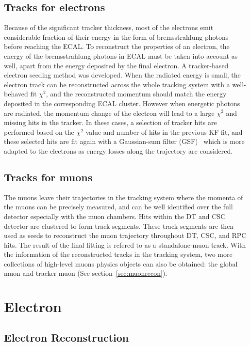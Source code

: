 \subsection{Tracks for electrons}
Because of the significant tracker thickness, most of the electrons emit considerable fraction of their energy in the form of bremsstrahlung photons before reaching the ECAL. To reconstruct the properties of an electron, the energy of the bremsstrahlung photons in ECAL must be taken into account as well, apart from the energy deposited by the final electron. A tracker-based electron seeding method was developed. When the radiated energy is small, the electron track can be reconstructed across the whole tracking system with a well-behaved fit $\chi^2$, and the reconstructed momentum should match the energy deposited in the corresponding ECAL cluster. However when energetic photons are radiated, the momentum change of the electron will lead to a large $\chi^2$ and missing hits in the tracker. In these cases, a selection of tracker hits are performed based on the $\chi^2$ value and number of hits in the previous KF fit, and these selected hits are fit again with a Gaussian-sum filter (GSF)~\cite{ob_electronconst} which is more adapted to the electrons as energy losses along the trajectory are considered. 

\subsection{Tracks for muons}
The muons leave their trajectories in the tracking system where the momenta of the muons can be precisely measured, and can be well identified over the full detector especially with the muon chambers. Hits within the DT and CSC detector are clustered to form track segments. These track segments are then used as seeds to reconstruct the muon trajectory throughout DT, CSC, and RPC hits. The result of the final fitting is refered to as a standalone-muon track. With the information of the reconstructed tracks in the tracking system, two more collections of high-level muons physics objects can also be obtained: the global muon and tracker muon (See section~\ref{sec:muonrecon}).

\section{Electron}

\subsection{Electron Reconstruction}
